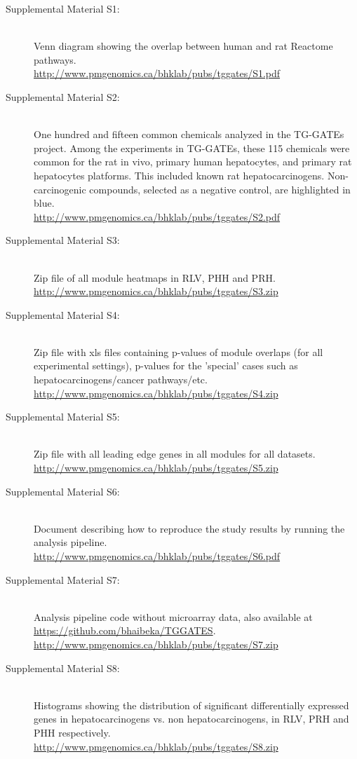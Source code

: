 \documentclass[a4paper,12pt]{scrartcl}
\begin{document}
\begin{description}
 \item[Supplemental Material S1:] \hfill \\ Venn diagram showing the overlap between human and rat Reactome pathways. \\ \textcolor{blue}{\url{http://www.pmgenomics.ca/bhklab/pubs/tggates/S1.pdf}} 
 \item[Supplemental Material S2:] \hfill \\ One hundred and fifteen common chemicals analyzed in the TG-GATEs project. Among the experiments in TG-GATEs, these 115 chemicals were common for the rat in vivo, primary human hepatocytes, and primary rat hepatocytes platforms. This included known rat hepatocarcinogens. Non-carcinogenic compounds, selected as a negative control, are highlighted in blue. \\ \textcolor{blue}{\url{http://www.pmgenomics.ca/bhklab/pubs/tggates/S2.pdf}}
 \item[Supplemental Material S3:] \hfill \\ Zip file of all module heatmaps in RLV, PHH and PRH. \\ \textcolor{blue}{\url{http://www.pmgenomics.ca/bhklab/pubs/tggates/S3.zip}}
 \item[Supplemental Material S4:] \hfill \\ Zip file with xls files containing p-values of module overlaps (for all experimental settings), p-values for the 'special' cases such as hepatocarcinogens/cancer pathways/etc. \\ \textcolor{blue}{\url{http://www.pmgenomics.ca/bhklab/pubs/tggates/S4.zip}}
 \item[Supplemental Material S5:] \hfill \\ Zip file with all leading edge genes in all modules for all datasets. \\ \textcolor{blue}{\url{http://www.pmgenomics.ca/bhklab/pubs/tggates/S5.zip}}
 \item[Supplemental Material S6:] \hfill \\ Document describing how to reproduce the study results by running the analysis pipeline. \\ \textcolor{blue}{\url{http://www.pmgenomics.ca/bhklab/pubs/tggates/S6.pdf}}
 \item[Supplemental Material S7:] \hfill \\ Analysis pipeline code without microarray data, also available at \url{https://github.com/bhaibeka/TGGATES}. \\ \textcolor{blue}{\url{http://www.pmgenomics.ca/bhklab/pubs/tggates/S7.zip}}
 \item[Supplemental Material S8:] \hfill \\ Histograms showing the distribution of significant differentially expressed genes in hepatocarcinogens vs. non hepatocarcinogens, in RLV, PRH and PHH respectively. \\ \textcolor{blue}{\url{http://www.pmgenomics.ca/bhklab/pubs/tggates/S8.zip}}
\end{description}
% 
\end{document}
